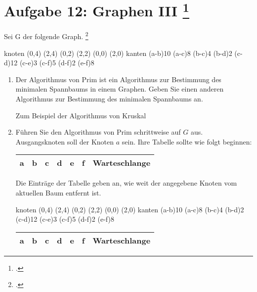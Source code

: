 \documentclass{lehramt-informatik-minimal}
\begin{document}
\section{Aufgabe 12: Graphen III
\footcite[(entnommen aus Algorithmen und Datenstrukturen, Übungsblatt 7, Universität Würzburg)]{aud:pu:7}}

Sei G der folgende Graph.
\footcite[Thema 2 Aufgabe 4 (gekürzt)]{examen:46115:2018:03}

\graph knoten {
  (0,4)
  (2,4)
  (0,2)
  (2,2)
  (0,0)
  (2,0)
} kanten {
  \kante(a-b){10}
  \kante(a-c){8}
  \kante(b-c){4}
  \kante(b-d){2}
  \kante(c-d){12}
  \kante(c-e){3}
  \kante(c-f){5}
  \kante(d-f){2}
  \kante(e-f){8}
}

\begin{enumerate}


\item Der Algorithmus von Prim ist ein Algorithmus zur Bestimmung des
minimalen Spannbaums in einem Graphen. Geben Sie einen anderen
Algorithmus zur Bestimmung des minimalen Spannbaums an.

\begin{antwort}
Zum Beispiel der Algorithmus von Kruskal
\end{antwort}


\item Führen Sie den Algorithmus von Prim schrittweise auf $G$ aus.
Ausgangsknoten soll der Knoten $a$ sein. Ihre Tabelle sollte wie folgt
beginnen:

\begin{tabular}{|l|l|l|l|l|l|l|}
\hline
a &
b &
c &
d &
e &
f &
Warteschlange\\\hline
\end{tabular}

Die Einträge der Tabelle geben an, wie weit der angegebene Knoten
vom aktuellen Baum entfernt ist.

\begin{antwort}
\graph knoten {
  (0,4)
  (2,4)
  (0,2)
  (2,2)
  (0,0)
  (2,0)
} kanten {
  \kante(a-b){10}
  \KANTE(a-c){8}
  \KANTE(b-c){4}
  \KANTE(b-d){2}
  \kante(c-d){12}
  \KANTE(c-e){3}
  \kante(c-f){5}
  \KANTE(d-f){2}
  \kante(e-f){8}
}

\begin{tabular}{|l|l|l|l|l|l|l|}
\hline
a &
b &
c &
d &
e &
f &
Warteschlange\\\hline\hline


\end{tabular}
\end{antwort}
\end{enumerate}
\end{document}

